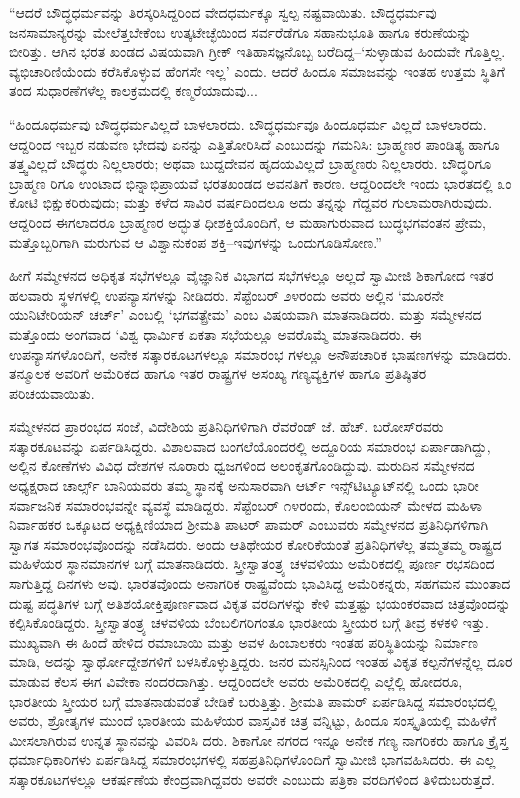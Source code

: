 “ಆದರೆ ಬೌದ್ಧಧರ್ಮವನ್ನು ತಿರಸ್ಕರಿಸಿದ್ದರಿಂದ ವೇದಧರ್ಮಕ್ಕೂ ಸ್ವಲ್ಪ ನಷ್ಟವಾಯಿತು. ಬೌದ್ಧಧರ್ಮವು ಜನಸಾಮಾನ್ಯರನ್ನು ಮೇಲೆತ್ತಬೇಕೆಂಬ ಉತ್ಕಟೇಚ್ಛೆಯಿಂದ ಸರ್ವರೆಡೆಗೂ ಸಹಾನುಭೂತಿ ಹಾಗೂ ಕರುಣೆಯನ್ನು ಬೀರಿತ್ತು. ಆಗಿನ ಭರತ ಖಂಡದ ವಿಷಯವಾಗಿ ಗ್ರೀಕ್ ಇತಿಹಾಸಜ್ಞನೊಬ್ಬ ಬರೆದಿದ್ದ–‘ಸುಳ್ಳಾಡುವ ಹಿಂದುವೇ ಗೊತ್ತಿಲ್ಲ. ವ್ಯಭಿಚಾರಿಣಿಯೆಂದು ಕರೆಸಿಕೊಳ್ಳುವ ಹೆಂಗಸೇ ಇಲ್ಲ’ ಎಂದು. ಆದರೆ ಹಿಂದೂ ಸಮಾಜವನ್ನು ಇಂತಹ ಉತ್ತಮ ಸ್ಥಿತಿಗೆ ತಂದ ಸುಧಾರಣೆಗಳೆಲ್ಲ ಕಾಲಕ್ರಮದಲ್ಲಿ ಕಣ್ಮರೆಯಾದುವು... 

“ಹಿಂದೂಧರ್ಮವು ಬೌದ್ಧಧರ್ಮವಿಲ್ಲದೆ ಬಾಳಲಾರದು. ಬೌದ್ಧಧರ್ಮವೂ ಹಿಂದೂಧರ್ಮ ವಿಲ್ಲದೆ ಬಾಳಲಾರದು. ಆದ್ದರಿಂದ ಇಬ್ಬರ ನಡುವಣ ಭೇದವು ಏನನ್ನು ಎತ್ತಿತೋರಿಸಿದೆ ಎಂಬುದನ್ನು ಗಮನಿಸಿ: ಬ್ರಾಹ್ಮಣರ ಪಾಂಡಿತ್ಯ ಹಾಗೂ ತತ್ತ್ವವಿಲ್ಲದೆ ಬೌದ್ಧರು ನಿಲ್ಲಲಾರರು; ಅಥವಾ ಬುದ್ದದೇವನ ಹೃದಯವಿಲ್ಲದೆ ಬ್ರಾಹ್ಮಣರು ನಿಲ್ಲಲಾರರು. ಬೌದ್ಧರಿಗೂ ಬ್ರಾಹ್ಮಣ ರಿಗೂ ಉಂಟಾದ ಭಿನ್ನಾಭಿಪ್ರಾಯವೆ ಭರತಖಂಡದ ಅವನತಿಗೆ ಕಾರಣ. ಆದ್ದರಿಂದಲೇ ಇಂದು ಭಾರತದಲ್ಲಿ ೩ಂ ಕೋಟಿ ಭಿಕ್ಷುಕರಿರುವುದು; ಮತ್ತು ಕಳೆದ ಸಾವಿರ ವರ್ಷದಿಂದಲೂ ಅದು ತನ್ನನ್ನು ಗೆದ್ದವರ ಗುಲಾಮರಾಗಿರುವುದು. ಆದ್ದರಿಂದ ಈಗಲಾದರೂ ಬ್ರಾಹ್ಮಣರ ಅದ್ಭುತ ಧೀಶಕ್ತಿಯೊಂದಿಗೆ, ಆ ಮಹಾಗುರುವಾದ ಬುದ್ಧಭಗವಂತನ ಪ್ರೇಮ, ಮತ್ತೊಬ್ಬರಿಗಾಗಿ ಮರುಗುವ ಆ ವಿಶ್ವಾನುಕಂಪ ಶಕ್ತಿ–ಇವುಗಳನ್ನು ಒಂದುಗೂಡಿಸೋಣ.”

ಹೀಗೆ ಸಮ್ಮೇಳನದ ಅಧಿಕೃತ ಸಭೆಗಳಲ್ಲೂ ವೈಜ್ಞಾನಿಕ ವಿಭಾಗದ ಸಭೆಗಳಲ್ಲೂ ಅಲ್ಲದೆ ಸ್ವಾಮೀಜಿ ಶಿಕಾಗೋದ ಇತರ ಹಲವಾರು ಸ್ಥಳಗಳಲ್ಲಿ ಉಪನ್ಯಾಸಗಳನ್ನು ನೀಡಿದರು. ಸೆಪ್ಟೆಂಬರ್ ೨೪ರಂದು ಅವರು ಅಲ್ಲಿನ ‘ಮೂರನೇ ಯುನಿಟೇರಿಯನ್ ಚರ್ಚ್​’ ಎಂಬಲ್ಲಿ ‘ಭಗವತ್ಪ್ರೇಮ’ ಎಂಬ ವಿಷಯವಾಗಿ ಮಾತನಾಡಿದರು. ಮತ್ತು ಸಮ್ಮೇಳನದ ಮತ್ತೊಂದು ಅಂಗವಾದ ‘ವಿಶ್ವ ಧಾರ್ಮಿಕ ಏಕತಾ ಸಭೆಯಲ್ಲೂ ಅವರೊಮ್ಮೆ ಮಾತನಾಡಿದರು. ಈ ಉಪನ್ಯಾಸಗಳೊಂದಿಗೆ, ಅನೇಕ ಸತ್ಕಾರಕೂಟಗಳಲ್ಲೂ ಸಮಾರಂಭ ಗಳಲ್ಲೂ ಅನೌಪಚಾರಿಕ ಭಾಷಣಗಳನ್ನು ಮಾಡಿದರು. ತನ್ಮೂಲಕ ಅವರಿಗೆ ಅಮೆರಿಕದ ಹಾಗೂ ಇತರ ರಾಷ್ಟ್ರಗಳ ಅಸಂಖ್ಯ ಗಣ್ಯವ್ಯಕ್ತಿಗಳ ಹಾಗೂ ಪ್ರತಿಷ್ಠಿತರ ಪರಿಚಯವಾಯಿತು.

ಸಮ್ಮೇಳನದ ಪ್ರಾರಂಭದ ಸಂಜೆ, ವಿದೇಶಿಯ ಪ್ರತಿನಿಧಿಗಳಿಗಾಗಿ ರೆವರೆಂಡ್ ಜೆ. ಹೆಚ್. ಬರೋಸ್​ರವರು ಸತ್ಕಾರಕೂಟವನ್ನು ಏರ್ಪಡಿಸಿದ್ದರು. ವಿಶಾಲವಾದ ಬಂಗಲೆಯೊಂದರಲ್ಲಿ ಅದ್ದೂರಿಯ ಸಮಾರಂಭ ಏರ್ಪಾಡಾಗಿದ್ದು, ಅಲ್ಲಿನ ಕೋಣೆಗಳು ವಿವಿಧ ದೇಶಗಳ ನೂರಾರು ಧ್ವಜಗಳಿಂದ ಅಲಂಕೃತಗೊಂಡಿದ್ದುವು. ಮರುದಿನ ಸಮ್ಮೇಳನದ ಅಧ್ಯಕ್ಷರಾದ ಚಾರ್ಲ್ಸ್ ಬಾನಿಯವರು ತಮ್ಮ ಸ್ಥಾನಕ್ಕೆ ಅನುಸಾರವಾಗಿ ಆರ್ಟ್ ಇನ್ಸ್​ಟಿಟ್ಯೂಟ್​ನಲ್ಲಿ ಒಂದು ಭಾರೀ ಸರ್ವಾಜನಿಕ ಸಮಾರಂಭವನ್ನೇ ವ್ಯವಸ್ಥೆ ಮಾಡಿದ್ದರು. ಸೆಪ್ಟೆಂಬರ್ ೧೪ರಂದು, ಕೊಲಂಬಿಯನ್ ಮೇಳದ ಮಹಿಳಾ ನಿರ್ವಾಹಕರ ಒಕ್ಕೂಟದ ಅಧ್ಯಕ್ಷಿಣಿಯಾದ ಶ್ರೀಮತಿ ಪಾಟರ್ ಪಾಮರ್ ಎಂಬುವರು ಸಮ್ಮೇಳನದ ಪ್ರತಿನಿಧಿಗಳಿಗಾಗಿ ಸ್ವಾಗತ ಸಮಾರಂಭವೊಂದನ್ನು ನಡೆಸಿದರು. ಅಂದು ಆತಿಥೇಯರ ಕೋರಿಕೆಯಂತೆ ಪ್ರತಿನಿಧಿಗಳೆಲ್ಲ ತಮ್ಮತಮ್ಮ ರಾಷ್ಟ್ರದ ಮಹಿಳೆಯರ ಸ್ಥಾನಮಾನಗಳ ಬಗ್ಗೆ ಮಾತನಾಡಿದರು. ಸ್ತ್ರೀಸ್ವಾತಂತ್ರ್ಯ ಚಳವಳಿಯು ಅಮೆರಿಕದಲ್ಲಿ ಪೂರ್ಣ ರಭಸದಿಂದ ಸಾಗುತ್ತಿದ್ದ ದಿನಗಳು ಅವು. ಭಾರತವೊಂದು ಅನಾಗರಿಕ ರಾಷ್ಟ್ರವೆಂದು ಭಾವಿಸಿದ್ದ ಅಮೆರಿಕನ್ನರು, ಸಹಗಮನ ಮುಂತಾದ ದುಷ್ಟ ಪದ್ಧತಿಗಳ ಬಗ್ಗೆ ಅತಿಶಯೋಕ್ತಿಪೂರ್ಣವಾದ ವಿಕೃತ ವರದಿಗಳನ್ನು ಕೇಳಿ ಮತ್ತಷ್ಟು ಭಯಂಕರವಾದ ಚಿತ್ರವೊಂದನ್ನು ಕಲ್ಪಿಸಿಕೊಂಡಿದ್ದರು. ಸ್ತ್ರೀಸ್ವಾತಂತ್ರ್ಯ ಚಳವಳಿಯ ಬೆಂಬಲಿಗರಿಗಂತೂ ಭಾರತೀಯ ಸ್ತ್ರೀಯರ ಬಗ್ಗೆ ತೀವ್ರ ಕಳಕಳಿ ಇತ್ತು. ಮುಖ್ಯವಾಗಿ ಈ ಹಿಂದೆ ಹೇಳಿದ ರಮಾಬಾಯಿ ಮತ್ತು ಅವಳ ಹಿಂಬಾಲಕರು ಇಂತಹ ಪರಿಸ್ಥಿತಿಯನ್ನು ನಿರ್ಮಾಣ ಮಾಡಿ, ಅದನ್ನು ಸ್ವಾರ್ಥೋದ್ದೇಶಗಳಿಗೆ ಬಳಸಿಕೊಳ್ಳುತ್ತಿದ್ದರು. ಜನರ ಮನಸ್ಸಿನಿಂದ ಇಂತಹ ವಿಕೃತ ಕಲ್ಪನೆಗಳನ್ನೆಲ್ಲ ದೂರ ಮಾಡುವ ಕೆಲಸ ಈಗ ವಿವೇಕಾ ನಂದರದಾಗಿತ್ತು. ಆದ್ದರಿಂದಲೇ ಅವರು ಅಮೆರಿಕದಲ್ಲಿ ಎಲ್ಲೆಲ್ಲಿ ಹೋದರೂ, ಭಾರತೀಯ ಸ್ತ್ರೀಯರ ಬಗ್ಗೆ ಮಾತನಾಡುವಂತೆ ಬೇಡಿಕೆ ಬರುತ್ತಿತ್ತು. ಶ್ರೀಮತಿ ಪಾಮರ್ ಏರ್ಪಡಿಸಿದ್ದ ಸಮಾರಂಭದಲ್ಲಿ ಅವರು, ಶ್ರೋತೃಗಳ ಮುಂದೆ ಭಾರತೀಯ ಮಹಿಳೆಯರ ವಾಸ್ತವಿಕ ಚಿತ್ರ ವನ್ನಿಟ್ಟು, ಹಿಂದೂ ಸಂಸ್ಕೃತಿಯಲ್ಲಿ ಮಹಿಳೆಗೆ ಮೀಸಲಾಗಿರುವ ಉನ್ನತ ಸ್ಥಾನವನ್ನು ವಿವರಿಸಿ ದರು. ಶಿಕಾಗೋ ನಗರದ ಇನ್ನೂ ಅನೇಕ ಗಣ್ಯ ನಾಗರಿಕರು ಹಾಗೂ ಕ್ರೈಸ್ತ ಧರ್ಮಾಧಿಕಾರಿಗಳು ಏರ್ಪಡಿಸಿದ್ದ ಸಮಾರಂಭಗಳಲ್ಲಿ ಸಹಪ್ರತಿನಿಧಿಗಳೊಂದಿಗೆ ಸ್ವಾಮೀಜಿ ಭಾಗವಹಿಸಿದರು. ಈ ಎಲ್ಲ ಸತ್ಕಾರಕೂಟಗಳಲ್ಲೂ ಆಕರ್ಷಣೆಯ ಕೇಂದ್ರವಾಗಿದ್ದವರು ಅವರೇ ಎಂಬುದು ಪತ್ರಿಕಾ ವರದಿಗಳಿಂದ ತಿಳಿದುಬರುತ್ತದೆ.

